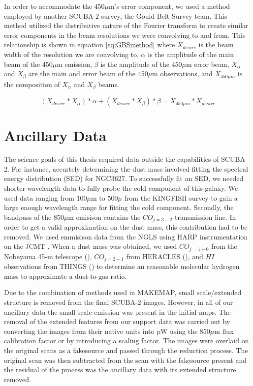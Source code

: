 
In order to accommodate the 450$\mu$m's error component, we used a method employed by another SCUBA-2 survey, the Gould-Belt Survey team.  This method utilized the distributive nature of the Fourier transform to create similar error components in the beam resolutions we were convolving to and from.  This relationship is shown in equation \ref{eq:GBSmethod} where $X_{desire}$ is the beam width of the resolution we are convolving to, $\alpha$ is the amplitude of the main beam of the 450$\mu$m emission, $\beta$ is the amplitude of the 450$\mu$m error beam, $X_{\alpha}$ and $X_{\beta}$ are the main and error beam of the 450$\mu$m observations, and $X_{450\mu m}$ is the composition of $X_{\alpha}$ and $X_{\beta}$ beams.

\begin{equation} \label{eq:GBSmethod}
  \left(X_{desire} \ast X_{\alpha}\right)*\alpha + \left(X_{desire} \ast X_{\beta}\right)*\beta = X_{450\mu m} \ast X_{desire}
\end{equation}

\section{Ancillary Data}

The science goals of this thesis required data outside the capabilities of SCUBA-2.  For instance, accurtely determining the dust mass involved fitting the spectral energy distribution (SED) for NGC3627.  To successfully fit an SED, we needed shorter wavelength data to fully probe the cold component of this galaxy. We used data ranging from 100$\mu$m to 500$\mu$ from the KINGFISH survey \citet{kennicutt2011} to gain a large enough wavelength range for fitting the cold component.  Secondly, the bandpass of the 850$\mu$m emisison contains the $CO_{j=3-2}$ transmission line.  In order to get a valid approximation on the dust mass, this contribution had to be removed.  We used emmisison data from the NGLS using HARP instrumentation on the JCMT \citet{wilson2012}.  When a dust mass was obtained, we used $CO_{j=1-0}$ from the Nobeyama 45-m telescope (\citet{kuno2007}), $CO_{j=2-1}$ from HERACLES (\protect\citet{leroy2009}), and $HI$ observations from THINGS (\protect\citet{walter2008}) to determine an reasonable molecular hydrogen mass to approximate a dust-to-gas ratio.

Due to the combination of methods used in MAKEMAP, small scale/extended structure is removed from the final SCUBA-2 images.  However, in all of our ancillary data the small scale emission was present in the initial maps.  The removal of the extended features from our support data was carried out by converting the images from their native units into pW using the 850$\mu$m flux calibration factor or by introducing a scaling factor.  The images were overlaid on the original scans as a fakesource and passed through the reduction process.  The original scan was then subtracted from the scan with the fakesource present and the residual of the process was the ancillary data with its extended structure removed.

